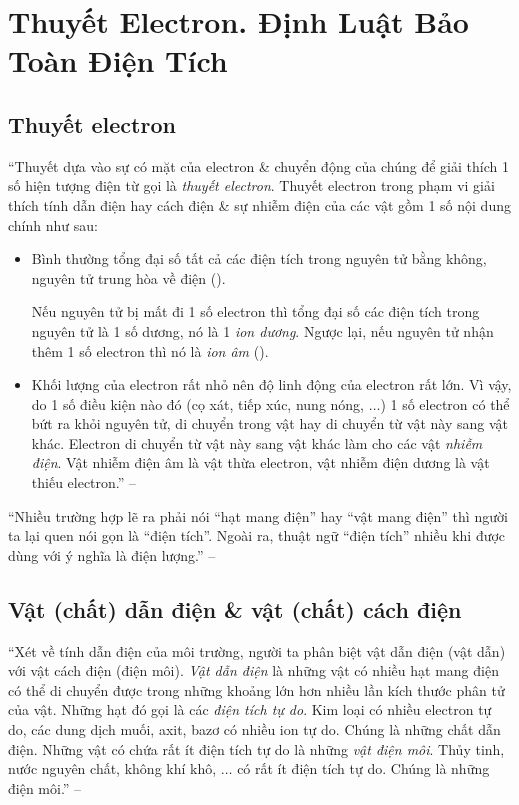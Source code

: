 \documentclass[oneside]{book}
\numberwithin{equation}{section}
\begin{document}

\section{Thuyết Electron. Định Luật Bảo Toàn Điện Tích}

\subsection{Thuyết electron}
``Thuyết dựa vào sự có mặt của electron \& chuyển động của chúng để giải thích 1 số hiện tượng điện từ gọi là \textit{thuyết electron}. Thuyết electron trong phạm vi giải thích tính dẫn điện hay cách điện \& sự nhiễm điện của các vật gồm 1 số nội dung chính như sau:
\begin{itemize}
	\item Bình thường tổng đại số tất cả các điện tích trong nguyên tử bằng không, nguyên tử trung hòa về điện (\cite[Hình 2.1: \textsf{Mô hình đơn giản của nguyên tử liti}, p. 10]{SGK_Vat_Ly_11_nang_cao}).
	
	Nếu nguyên tử bị mất đi 1 số electron thì tổng đại số các điện tích trong nguyên tử là 1 số dương, nó là 1 \textit{ion dương}. Ngược lại, nếu nguyên tử nhận thêm 1 số electron thì nó là \textit{ion âm} (\cite[Hình 2.2: \textsf{Mô hình đơn giản của nguyên tử liti. (a) ion dương liti; (b) ion âm liti}, p. 10]{SGK_Vat_Ly_11_nang_cao}).
	\item Khối lượng của electron rất nhỏ nên độ linh động của electron rất lớn. Vì vậy, do 1 số điều kiện nào đó (cọ xát, tiếp xúc, nung nóng, $\ldots$) 1 số electron có thể bứt ra khỏi nguyên tử, di chuyển trong vật hay di chuyển từ vật này sang vật khác. Electron di chuyển từ vật này sang vật khác làm cho các vật \textit{nhiễm điện}. Vật nhiễm điện âm là vật thừa electron, vật nhiễm điện dương là vật thiếu electron.'' -- \cite[p. 10]{SGK_Vat_Ly_11_nang_cao}
\end{itemize}
``Nhiều trường hợp lẽ ra phải nói ``hạt mang điện'' hay ``vật mang điện'' thì người ta lại quen nói gọn là ``điện tích''. Ngoài ra, thuật ngữ ``điện tích'' nhiều khi được dùng với ý nghĩa là điện lượng.'' -- \cite[p. 10]{SGK_Vat_Ly_11_nang_cao}

\subsection{Vật (chất) dẫn điện \& vật (chất) cách điện}
``Xét về tính dẫn điện của môi trường, người ta phân biệt vật dẫn điện (vật dẫn) với vật cách điện (điện môi). \textit{Vật dẫn điện} là những vật có nhiều hạt mang điện có thể di chuyển được trong những khoảng lớn hơn nhiều lần kích thước phân tử của vật. Những hạt đó gọi là các \textit{điện tích tự do}. Kim loại có nhiều electron tự do, các dung dịch muối, axit, bazơ có nhiều ion tự do. Chúng là những chất dẫn điện. Những vật có chứa rất ít điện tích tự do là những \textit{vật điện môi}. Thủy tinh, nước nguyên chất, không khí khô, $\ldots$ có rất ít điện tích tự do. Chúng là những điện môi.'' -- \cite[pp. 10--11]{SGK_Vat_Ly_11_nang_cao}
\end{document}
